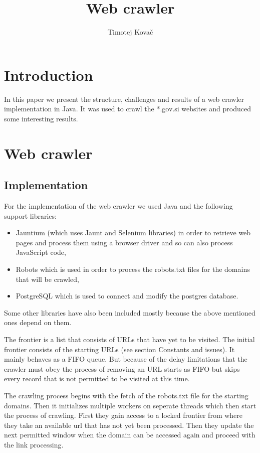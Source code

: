\documentclass[9pt]{IEEEtran}
\title{\vspace{0ex}
Web crawler}
\author{Timotej Kovač\vspace{-4.0ex}}
\begin{document}
\maketitle

\section{Introduction}

In this paper we present the structure, challenges and results of a web crawler implementation in Java.
It was used to crawl the *.gov.si websites and produced some interesting results.

\section{Web crawler}

\subsection{Implementation}

For the implementation of the web crawler we used Java and the following support libraries:
\begin{itemize}
\item{Jauntium (which uses Jaunt and Selenium libraries) in order to retrieve web pages and process them using a browser driver and so can also process JavaScript code,}
\item{Robots which is used in order to process the robots.txt files for the domains that will be crawled, }
\item{PostgreSQL which is used to connect and modify the postgres database.}
\end{itemize}

Some other libraries have also been included mostly because the above mentioned ones depend on them.

The frontier is a list that consists of URLs that have yet to be visited.
The initial frontier consists of the starting URLs (see section Constants and issues).
It mainly behaves as a FIFO queue.
But because of the delay limitations that the crawler must obey the process of removing an URL starts as FIFO but skips every record that is not permitted to be visited at this time.

The crawling process begins with the fetch of the robots.txt file for the starting domains. 
Then it initializes multiple workers on seperate threads which then start the process of crawling.
First they gain access to a locked frontier from where they take an available url that has not yet been processed.
Then they update the next permitted window when the domain can be accessed again and proceed with the link processing.
\end{document}
